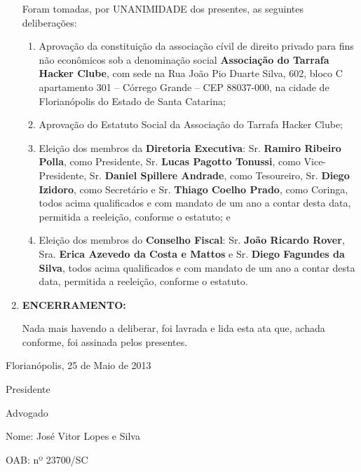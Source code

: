 \documentclass[a4paper]{report}
\begin{document}
\begin{enumerate}
      Foram tomadas, por UNANIMIDADE dos presentes, as seguintes deliberações:
      \begin{enumerate}[label=(\arabic*)]
      \item Aprovação da constituição da associação cívil de direito privado
      para fins não econômicos sob a denominação social
      \textbf{Associação do Tarrafa Hacker Clube}, com sede na
      Rua João Pio Duarte Silva, 602, bloco C apartamento 301 – Córrego Grande – CEP 88037-000,
      na cidade de Florianópolis do Estado de Santa Catarina;
      \item Aprovação do Estatuto Social da Associação do Tarrafa Hacker Clube;
      \item Eleição dos membros da \textbf{Diretoria Executiva}:
          Sr. \textbf{Ramiro Ribeiro Polla}, como Presidente,
          Sr. \textbf{Lucas Pagotto Tonussi}, como Vice-Presidente,
          Sr. \textbf{Daniel Spillere Andrade}, como Tesoureiro,
          Sr. \textbf{Diego Izidoro}, como Secretário e
          Sr. \textbf{Thiago Coelho Prado}, como Coringa,
       todos acima qualificados e com mandato de um ano a contar desta
       data, permitida a reeleição, conforme o estatuto; e
      \item Eleição dos membros do \textbf{Conselho Fiscal}:
          Sr.  \textbf{João Ricardo Rover},
          Sra. \textbf{Erica Azevedo da Costa e Mattos} e
          Sr.  \textbf{Diego Fagundes da Silva},
       todos acima qualificados e com mandato de um ano a contar desta
       data, permitida a reeleição, conforme o estatuto.
      \end{enumerate}

\item \textbf{ENCERRAMENTO:}

      Nada mais havendo a deliberar, foi lavrada e lida esta ata que,
      achada conforme, foi assinada pelos presentes.

\end{enumerate}

\vspace{1cm}

\hfill {\raggedright Florianópolis, 25 de Maio de 2013}

\begin{center}
\vspace{2cm}
\makebox[7cm]{\hrulefill}

Presidente

\vspace{2cm}
\makebox[7cm]{\hrulefill}

Advogado

Nome: José Vitor Lopes e Silva

OAB: nº 23700/SC

\vspace{2cm}
\end{center}
\end{document}
